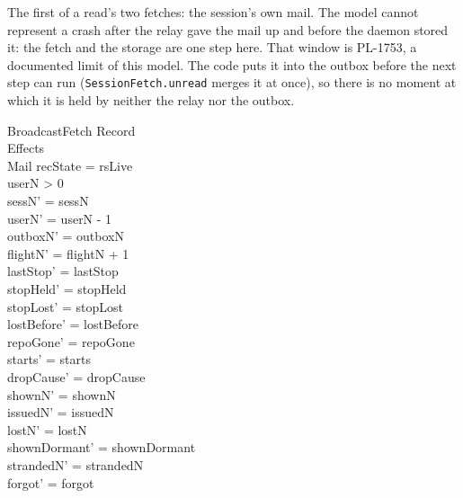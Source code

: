 \documentclass[a4paper,10pt,fleqn]{article}
\begin{document}
The first of a read's two fetches: the session's own mail.  The model cannot represent a
crash after the relay gave the mail up and before the daemon stored it: the fetch and the
storage are one step here.  That window is PL-1753, a documented limit of this model.  The code puts it into
the outbox before the next step can run (\texttt{SessionFetch.unread} merges it at once), so
there is no moment at which it is held by neither the relay nor the outbox.

\begin{schema}{BroadcastFetch}
  \Xi Record \\
  \Xi Effects \\
  \Delta Mail
  \where
  recState = rsLive \\
  userN > 0 \\
  sessN' = sessN \\
  userN' = userN - 1 \\
  outboxN' = outboxN \\
  flightN' = flightN + 1 \\
  lastStop' = lastStop \\
  stopHeld' = stopHeld \\
  stopLost' = stopLost \\
  lostBefore' = lostBefore \\
  repoGone' = repoGone \\
  starts' = starts \\
  dropCause' = dropCause \\
  shownN' = shownN \\
  issuedN' = issuedN \\
  lostN' = lostN \\
  shownDormant' = shownDormant \\
  strandedN' = strandedN \\
  forgot' = forgot
\end{schema}
\end{document}
